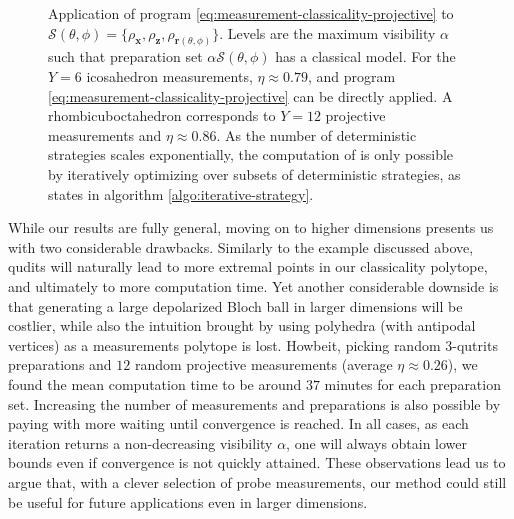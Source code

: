 	\begin{figure*}[t!]
        \centering
        \caption{Application of program \eqref{eq:measurement-classicality-projective} to $\mathcal{S}(\theta, \phi) = \{ \rho_{\mathbf{x}}, \rho_{\mathbf{z}}, \rho_{\mathbf{r}(\theta, \phi)} \}$. Levels are the maximum visibility $\alpha$ such that preparation set $\alpha \mathcal{S}(\theta, \phi)$ has a classical model.  For the $Y = 6$ icosahedron measurements, $\eta \approx 0.79$, and program \eqref{eq:measurement-classicality-projective} can be directly applied.  A rhombicuboctahedron corresponds to $Y = 12$ projective measurements and $\eta \approx 0.86$. As the number of deterministic strategies scales exponentially, the computation of  is only possible by iteratively optimizing over subsets of deterministic strategies, as states in algorithm \ref{algo:iterative-strategy}.}
    \end{figure*}

	While our results are fully general, moving on to higher dimensions presents us with two considerable drawbacks. Similarly to the example discussed above, qudits will naturally lead to more extremal points in our classicality polytope, and ultimately to more computation time. Yet another considerable downside is that generating a large depolarized Bloch ball in larger dimensions will be costlier, while also the intuition brought by using polyhedra (with antipodal vertices) as a measurements polytope is lost. Howbeit, picking random $3$-qutrits preparations and $12$ random projective measurements (average $\eta \approx 0.26$), we found the mean computation time to be around $37$ minutes for each preparation set. Increasing the number of measurements and preparations is also possible by paying with more waiting until convergence is reached. In all cases, as each iteration returns a non-decreasing visibility $\alpha$, one will always obtain lower bounds even if convergence is not quickly attained. These observations lead us to argue that, with a clever selection of probe measurements, our method could still be useful for future applications even in larger dimensions.